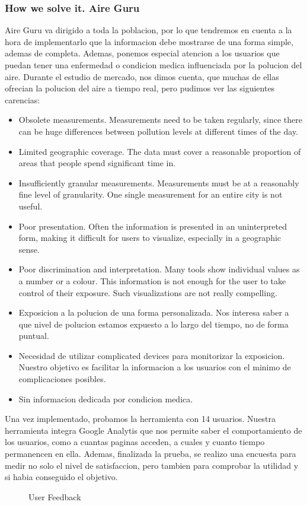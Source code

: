 \subsubsection{How we solve it. Aire Guru} 
Aire Guru va dirigido a toda la poblacion, por lo que tendremos en cuenta a la hora de implementarlo que la informacion debe
mostrarse de una forma simple, ademas de completa. Ademas, ponemos especial atencion a los usuarios que puedan tener una
enfermedad o condicion medica influenciada por la polucion del aire.
Durante el estudio de mercado, nos dimos cuenta, que muchas de ellas ofrecian la polucion del aire a tiempo real, pero 
pudimos ver las siguientes carencias:
\begin{itemize}
    \item Obsolete measurements. Measurements need to be taken regularly, since there can be huge differences
    between pollution levels at different times of the day.
    \item Limited geographic coverage. The data must cover a reasonable proportion of areas that people spend significant time in.
    \item Insufficiently granular measurements. Measurements must be at a reasonably fine level of granularity. One single measurement for an entire city is not useful.
    \item Poor presentation. Often the information is presented in an uninterpreted form, making it difficult for users to visualize, especially in a geographic sense.
    \item Poor discrimination and interpretation. Many tools show individual values as a number or a colour. This information is not
    enough for the user to take control of their exposure. Such visualizations are not really compelling. 
    \item Exposicion a la polucion de una forma personalizada. Nos interesa saber a que nivel de polucion estamos expuesto
    a lo largo del tiempo, no de forma puntual.
    \item Necesidad de utilizar complicated devices para monitorizar la exposicion. Nuestro objetivo es facilitar la informacion a los 
    usuarios con el minimo de complicaciones posibles.
    \item Sin informacion dedicada por condicion medica. 
\end{itemize}

Una vez implementado, probamos la herramienta con 14 usuarios. Nuestra herramienta integra Google Analytis que nos permite saber el 
comportamiento de los usuarios, como a cuantas paginas acceden, a cuales y cuanto tiempo permanencen en ella. Ademas, finalizada la prueba,
se realizo una encuesta para medir no solo el nivel de satisfaccion, pero tambien para comprobar la utilidad y si habia conseguido el objetivo.
\begin{figure}[ht]
    \centering
    \hfill
  
  \caption{User Feedback}
    \end{figure}
 
